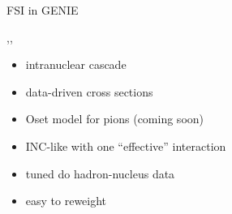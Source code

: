 \begin{slide}{FSI in GENIE}
\null\vfill

  \centering
  
  \sep\sep
  
  \twocolumn
  {
    \begin{itemize}
     \item intranuclear cascade
     \item data-driven cross sections
     \item Oset model for pions (coming soon)
    \end{itemize}
  }
  {
    \begin{itemize}
     \item INC-like with one ``effective'' interaction
     \item tuned do hadron-nucleus data
     \item easy to reweight 
    \end{itemize}
  }

\vfill\null
\end{slide}